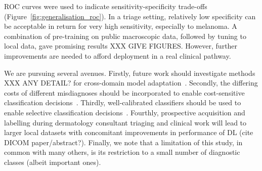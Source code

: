 ROC curves were used to indicate sensitivity-specificity trade-offs (Figure~\ref{fig:generalisation_roc}). In a triage setting, relatively low specificity can be acceptable in return for very high sensitivity, especially to melanoma. A combination of pre-training on public macroscopic data, followed by tuning to local data, gave promising results XXX GIVE FIGURES. However, further improvements are needed to afford deployment in a real clinical pathway. 

We are pursuing several avenues. Firstly, future work should investigate methods XXX ANY DETAIL? for cross-domain model adaptation~\citep{guan2021domain}. Secondly, the differing costs of different misdiagnoses should be incorporated to enable cost-sensitive classification decisions~\citep{carse2021robust}. Thirdly, well-calibrated classifiers should be used to enable selective classification decisions~\citep{carse2021robust,carse2022calibration}. Fourthly, prospective acquisition and labelling during dermatology consultant triaging and clinical work will lead to larger local datasets with concomitant improvements in performance of DL (cite DICOM paper/abstract?). Finally, we note that a limitation of this study, in common with many others, is its restriction to a small number of diagnostic classes (albeit important ones).
